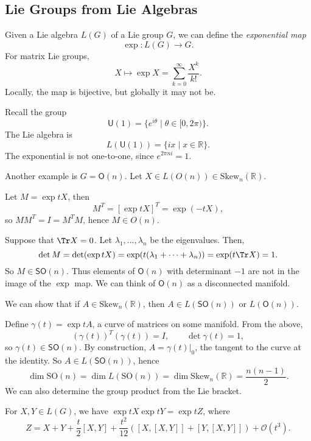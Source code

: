 \documentclass[12pt]{article}
\begin{document}

\subsection{Lie Groups from Lie Algebras}%
\label{sub:lg_la}

Given a Lie algebra $L(G)$ of a Lie group $G$, we can define the \emph{exponential map}
\[
\exp : L(G) \to G.
\]
For matrix Lie groups,
\[
X \mapsto \exp X = \sum_{k = 0}^\infty \frac{X^k}{k!}.
\]
Locally, the map is bijective, but globally it may not be.
\begin{exbox}
	Recall the group
	\[
		\mathsf{U}(1) = \{ e^{i\theta} \mid \theta \in [0, 2\pi)\}.
	\]
	The Lie algebra is
	\[
		L(\mathsf{U}(1)) = \{ ix \mid x \in \mathbb{R}\}.
	\]
	The exponential is not one-to-one, since $e^{2 \pi n i} = 1$.

	Another example is $G = \mathsf{O}(n)$. Let $X \in L(O(n)) \in \mathrm{Skew}_n(\mathbb{R})$.

	Let $M = \exp t X$, then
	\[
		M^T = [\exp tX]^T = \exp(-t X),
	\]
	so $MM^T = I = M^T M$, hence $M \in O(n)$.

	Suppose that $\Tr X = 0$. Let $\lambda_1, \ldots, \lambda_n$ be the eigenvalues. Then,
	\[
	\det M = \det (\exp t X) = \exp(t(\lambda_1 + \cdots + \lambda_n)) = \exp (t \Tr X) = 1.
	\]
	So $M \in \mathsf{SO}(n)$. Thus elements of $\mathsf{O}(n)$ with determinant $-1$ are not in the image of the $\exp$ map. We can think of $\mathsf{O}(n)$ as a disconnected manifold.
\end{exbox}

We can show that if $A \in \mathrm{Skew}_n(\mathbb{R})$, then $A \in L(\mathsf{SO}(n))$ or $L(\mathsf{O}(n))$.

Define $\gamma(t) = \exp t A$, a curve of matrices on some manifold. From the above,
\[
	(\gamma(t))^T(\gamma(t)) = I, \qquad \det \gamma(t) = 1,
\]
so $\gamma(t) \in \mathsf{SO}(n)$. By construction, $A = \gamma(t)|_0$, the tangent to the curve at the identity. So $A \in L(\mathsf{SO}(n))$, hence
\[
\dim \mathrm{SO}(n) = \dim L(\mathrm{SO}(n)) = \dim \mathrm{Skew}_n(\mathbb{R}) = \frac{n(n-1)}{2}.
\]
We can also determine the group product from the Lie bracket.
\begin{lemma}
	For $X, Y \in L(G)$, we have $\exp tX \exp tY = \exp tZ$, where
	\[
		Z = X + Y + \frac{t}{2}[X, Y] + \frac{t^2}{12}([X, [X, Y]] + [Y, [X, Y]]) + \mathcal{O}(t^3).
	\]
\end{lemma}
\end{document}
